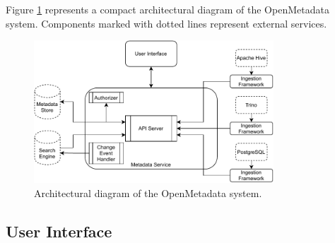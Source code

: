Figure \ref{fig:openmetadata_arch} represents a compact architectural diagram of the OpenMetadata system. Components marked with dotted lines represent external services. 

\begin{figure}
    \centering
    \includegraphics[width=0.8\textwidth]{chapters/tech_background/figures/openmetadata-arch.pdf}
    \caption{Architectural diagram of the OpenMetadata system.}
    \label{fig:openmetadata_arch}
\end{figure}

\subsection{User Interface}

